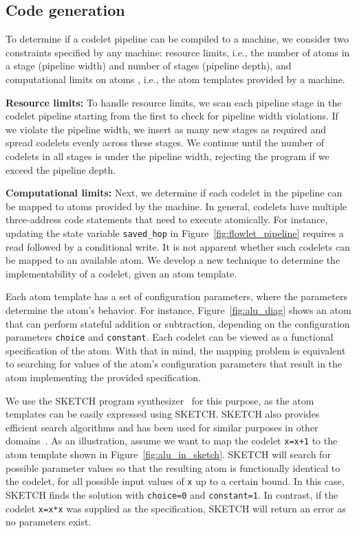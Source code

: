 \subsection{Code generation}
\label{ss:code_gen}

To determine if a codelet pipeline can be compiled to a \absmachine machine,
we consider two constraints specified by any \absmachine machine: resource
limits, i.e., the number of atoms in a stage (pipeline width) and number of
stages (pipeline depth), and computational limits on atoms
, i.e., the atom templates provided by a \absmachine machine.

\textbf{Resource limits:} To handle resource limits, we scan each pipeline
stage in the codelet pipeline starting from the first to check for pipeline
width violations. If we violate the pipeline width, we insert as many new
stages as required and spread codelets evenly across these stages.  We continue
until the number of codelets in all stages is under the pipeline width,
rejecting the program if we exceed the pipeline depth.

\textbf{Computational limits:} Next, we determine if each codelet in the pipeline
can be mapped to atoms provided by the \absmachine machine. In general,
codelets have multiple three-address code statements that need to execute
atomically. For instance, updating the state variable \texttt{saved\_hop} in
Figure~\ref{fig:flowlet_pipeline} requires a read followed by a conditional
write.  It is not apparent whether such codelets can be mapped to an available
atom. We develop a new technique to determine the implementability of a codelet,
given an atom template.

Each atom template has a set of configuration parameters, where the parameters
determine the atom's behavior.  For instance, Figure~\ref{fig:alu_diag} shows
an atom that can perform stateful addition or subtraction, depending on the
configuration parameters {\tt choice} and {\tt constant}.  Each codelet can be
viewed as a functional specification of the atom.  With that in mind, the
mapping problem is equivalent to searching for values of the atom's configuration
parameters that result in the atom implementing the provided specification.

We use the SKETCH program synthesizer~\cite{sketch_asplos} for this purpose, as
the atom templates can be easily expressed using SKETCH. SKETCH also
provides efficient search algorithms and has been used for similar purposes in
other domains~\cite{bitstreaming, qbs}. As an
illustration, assume we want to map the codelet {\tt x=x+1} to the atom
template shown in Figure~\ref{fig:alu_in_sketch}. SKETCH will search for
possible parameter values so that the resulting atom is functionally identical
to the codelet, for all possible input values of {\tt x} up to a certain bound. 
In this case, SKETCH
finds the solution with {\tt choice=0} and {\tt constant=1}.  In contrast, if
the codelet {\tt x=x*x} was supplied as the specification, SKETCH will return
an error as no parameters exist.

